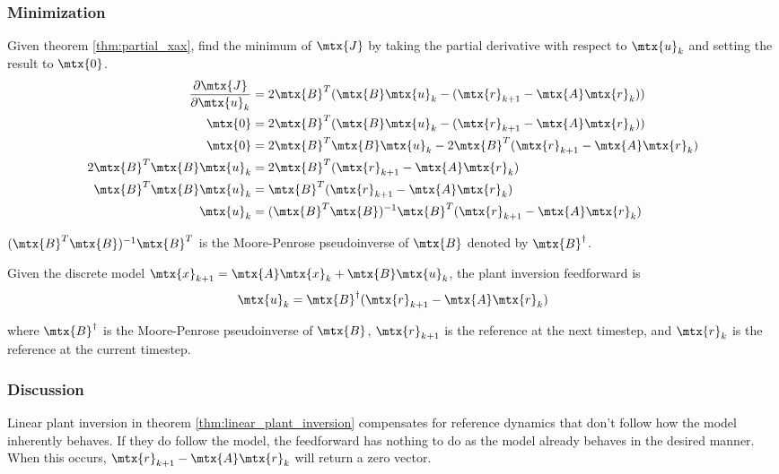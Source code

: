 \subsubsection{Minimization}

Given theorem \ref{thm:partial_xax}, find the minimum of $\mtx{J}$ by taking the
partial derivative with respect to $\mtx{u}_k$ and setting the result to
$\mtx{0}$.
\begin{align*}
  \frac{\partial\mtx{J}}{\partial\mtx{u}_k} &= 2\mtx{B}^T
    (\mtx{B}\mtx{u}_k - (\mtx{r}_{k+1} - \mtx{A}\mtx{r}_k)) \\
  \mtx{0} &= 2\mtx{B}^T
    (\mtx{B}\mtx{u}_k - (\mtx{r}_{k+1} - \mtx{A}\mtx{r}_k)) \\
  \mtx{0} &= 2\mtx{B}^T\mtx{B}\mtx{u}_k -
    2\mtx{B}^T(\mtx{r}_{k+1} - \mtx{A}\mtx{r}_k) \\
  2\mtx{B}^T\mtx{B}\mtx{u}_k &=
    2\mtx{B}^T(\mtx{r}_{k+1} - \mtx{A}\mtx{r}_k) \\
  \mtx{B}^T\mtx{B}\mtx{u}_k &=
    \mtx{B}^T(\mtx{r}_{k+1} - \mtx{A}\mtx{r}_k) \\
  \mtx{u}_k &=
    (\mtx{B}^T\mtx{B})^{-1} \mtx{B}^T(\mtx{r}_{k+1} - \mtx{A}\mtx{r}_k)
\end{align*}

$(\mtx{B}^T\mtx{B})^{-1} \mtx{B}^T$ is the Moore-Penrose pseudoinverse of
$\mtx{B}$ denoted by $\mtx{B}^\dagger$.
\begin{theorem}
  \label{thm:linear_plant_inversion}

  Given the discrete model
  $\mtx{x}_{k+1} = \mtx{A}\mtx{x}_k + \mtx{B}\mtx{u}_k$, the plant inversion
  feedforward is
  \begin{equation}
    \mtx{u}_k = \mtx{B}^\dagger (\mtx{r}_{k+1} - \mtx{A}\mtx{r}_k)
  \end{equation}

  where $\mtx{B}^\dagger$ is the Moore-Penrose pseudoinverse of $\mtx{B}$,
  $\mtx{r}_{k+1}$ is the reference at the next timestep, and $\mtx{r}_k$ is the
  reference at the current timestep.
\end{theorem}

\subsubsection{Discussion}

Linear \gls{plant} inversion in theorem \ref{thm:linear_plant_inversion}
compensates for \gls{reference} dynamics that don't follow how the \gls{model}
inherently behaves. If they do follow the \gls{model}, the feedforward has
nothing to do as the \gls{model} already behaves in the desired manner. When
this occurs, $\mtx{r}_{k+1} - \mtx{A}\mtx{r}_k$ will return a zero vector.

